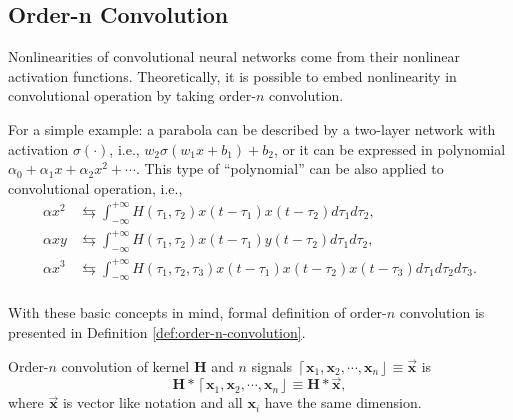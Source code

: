 \documentclass[twoside,11pt]{article}
\def\tvar#1{\mathbf{#1}} %
\def\vsymb#1{\vec{\mathbf{#1}}}
\def\intinf{\int_{-\infty}^{+\infty}\!}
\def\lcerfl#1{\left\lceil{#1}\right\rfloor}
\begin{document}
\subsection{Order-n Convolution}
\label{subsec:order-n-convolution}

Nonlinearities of convolutional neural networks come from their nonlinear activation functions. Theoretically, it is possible to embed nonlinearity in convolutional operation by taking order-\(n\) convolution.

For a simple example: a parabola can be described by a two-layer network with activation \(\sigma(\cdot)\), i.e., \(w_2 \sigma(w_1 x + b_1) + b_2\), or it can be expressed in polynomial \(\alpha_0 + \alpha_1 x + \alpha_2 x^2 + \cdots\).
This type of ``polynomial'' can be also applied to convolutional operation, i.e.,
\begin{equation*}
  \begin{aligned}
    \alpha x^2 & \leftrightarrows \intinf H(\tau_1, \tau_2) x(t - \tau_1) x(t-\tau_2) d \tau_1 d \tau_2,                                \\
    \alpha xy  & \leftrightarrows \intinf H(\tau_1, \tau_2) x(t - \tau_1) y(t-\tau_2) d \tau_1 d \tau_2,                                \\
    \alpha x^3 & \leftrightarrows \intinf H(\tau_1, \tau_2, \tau_3) x(t - \tau_1) x(t-\tau_2) x(t - \tau_3) d \tau_1 d \tau_2 d \tau_3. \\
  \end{aligned}
\end{equation*}

With these basic concepts in mind, formal definition of order-\(n\) convolution is presented in Definition \ref{def:order-n-convolution}.

\begin{definition}
  Order-\(n\) convolution \citep{volterra1932theory, rugh1981nonlinear} of kernel \(\tvar{H}\) and \(n\) signals \(\lcerfl{\tvar{x}_1, \tvar{x}_2, \cdots, \tvar{x}_n} \equiv \vsymb{x}\) is
  \begin{equation}
    \tvar{H} * \lcerfl{\tvar{x}_1, \tvar{x}_2, \cdots, \tvar{x}_n} \equiv \tvar{H} * \vsymb{x},
    \label{equ:def-order-n-convolution-1d}
  \end{equation}
  where \(\vsymb{x}\) is vector like notation and all \(\tvar{x}_i\) have the same dimension.
  \label{def:order-n-convolution}
\end{definition}
\end{document}
